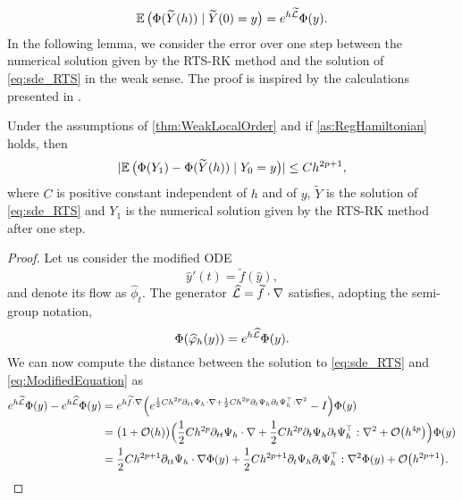 \documentclass[10pt]{article}
\begin{document}
{\begin{equation}
	\operatorname{\mathbb{E}} \big(\Phi(\widetilde Y(h))\mid \widetilde Y(0) = y\big) = e^{h\widetilde {\mathcal{L}}}\Phi(y).
\end{equation}
In the following lemma, we consider the error over one step between the numerical solution given by the RTS-RK method and the solution of \eqref{eq:sde_RTS} in the weak sense. The proof is inspired by the calculations presented in \cite[Section 2.4]{CGS17}.
\begin{lemma}\label{lem:WeakSDELocal} Under the assumptions of \cref{thm:WeakLocalOrder} and if \cref{as:RegHamiltonian} holds, then
	\begin{equation}
		\lvert\operatorname{\mathbb{E}}\big(\Phi(Y_1)- \Phi(\widetilde Y(h))\mid Y_0 = y\big)\rvert \leq C h^{2p+1},
	\end{equation}
	where $C$ is positive constant independent of $h$ and of $y$, $\tilde Y$ is the solution of \eqref{eq:sde_RTS} and $Y_1$ is the numerical solution given by the RTS-RK method after one step.
\end{lemma}
\begin{proof} Let us consider the modified ODE 
	\begin{equation}\label{eq:ModifiedEquation}
		\hat y'(t) = \tilde f(\hat y), 
	\end{equation}
	and denote its flow as $\hat \phi_t$. The generator $\widehat {\mathcal{L}} = \widetilde f \cdot \nabla$ satisfies, adopting the semi-group notation,
	\begin{equation}
		\Phi(\widehat {\varphi}_h(y)) = e^{h\widehat {\mathcal{L}}}\Phi(y).
	\end{equation} 
	We can now compute the distance between the solution to \eqref{eq:sde_RTS} and \eqref{eq:ModifiedEquation} as
	\begin{equation}
	\begin{aligned}
		e^{h \widetilde {\mathcal{L}}}\Phi(y)- e^{h \widehat {\mathcal{L}}}\Phi(y) &= e^{h\widetilde f \cdot \nabla}\Big(e^{\frac{1}{2}Ch^{2p}\partial_{tt}\Psi_h \cdot \nabla + \frac{1}{2}Ch^{2p}\partial_t \Psi_h \partial_t \Psi_h^\top : \nabla^2} - I\Big) \Phi(y)\\
		&= \big(1 + \mathcal{O}(h)\big)\Big(\frac{1}{2}Ch^{2p}\partial_{tt}\Psi_h \cdot \nabla + \frac{1}{2}Ch^{2p}\partial_t \Psi_h \partial_t \Psi_h^\top : \nabla^2 + \mathcal{O}\big(h^{4p}\big)\Big)\Phi(y) \\
		&= \frac{1}{2}Ch^{2p+1}\partial_{tt}\Psi_h \cdot \nabla\Phi(y) + \frac{1}{2}Ch^{2p+1}\partial_t \Psi_h \partial_t \Psi_h^\top : \nabla^2 \Phi(y) + \mathcal{O}\big(h^{2p+1}\big).
	\end{aligned}
	\end{equation}

\end{proof}}
\end{document}
